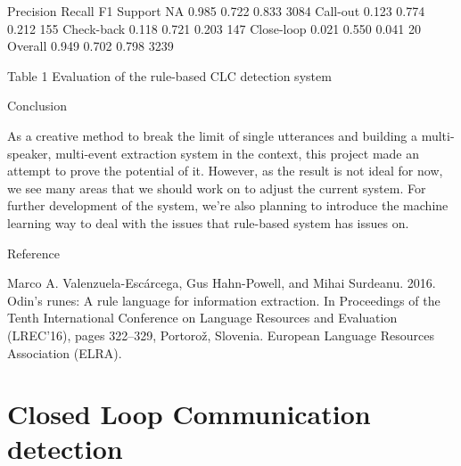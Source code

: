 Precision
Recall
F1
Support
NA
0.985
0.722
0.833
3084
Call-out
0.123
0.774
0.212
155
Check-back
0.118
0.721
0.203
147
Close-loop
0.021
0.550
0.041
20
Overall
0.949
0.702
0.798
3239


Table 1  Evaluation of the rule-based CLC detection system

Conclusion

As a creative method to break the limit of single utterances and building a
multi-speaker, multi-event extraction system in the context, this project made
an attempt to prove the potential of it. However, as the result is not ideal
for now, we see many areas that we should work on to adjust the current system.
For further development of the system, we’re also planning to introduce the
machine learning way to deal with the issues that rule-based system has issues
on. 

Reference

Marco A. Valenzuela-Escárcega, Gus Hahn-Powell, and Mihai Surdeanu. 2016.
Odin’s runes: A rule language for information extraction. In Proceedings of the
Tenth International Conference on Language Resources and Evaluation (LREC’16),
pages 322–329, Portorož, Slovenia. European Language Resources Association
(ELRA).  \section{Closed Loop Communication detection}
